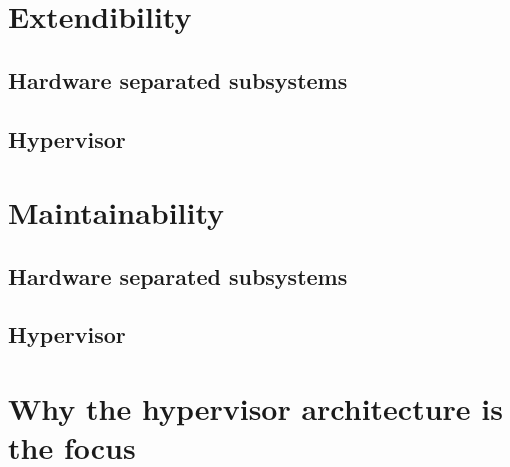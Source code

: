 \section{Extendibility}
\subsection{Hardware separated subsystems}
\subsection{Hypervisor}


\section{Maintainability}
\subsection{Hardware separated subsystems}
\subsection{Hypervisor}


\section{Why the hypervisor architecture is the focus}